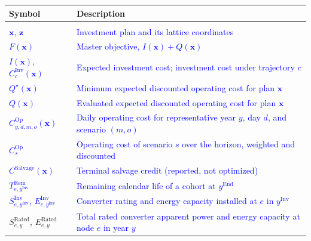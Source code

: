 \documentclass[preprint,12pt]{elsarticle}
\begin{document}
\begingroup
    \footnotesize
    \setlength{\LTpre}{0pt}
    \setlength{\LTpost}{0pt}
    \begin{longtable}{@{}>{\raggedright\arraybackslash}p{} >{\raggedright\arraybackslash}p{}@{}}
        \toprule
        \textbf{Symbol} & \textbf{Description} \\
        \midrule
        \endhead
        \midrule
        \endfoot
        \bottomrule
        \endlastfoot
        \multicolumn{2}{@{}l}{\textbf{Planning}}\\*
        \textcolor{blue}{$\boldsymbol{x}$, $\boldsymbol{z}$} & \textcolor{blue}{Investment plan and its lattice coordinates} \\
        \textcolor{blue}{$F(\boldsymbol{x})$} & \textcolor{blue}{Master objective, $I(\boldsymbol{x}) + Q(\boldsymbol{x})$} \\
        \textcolor{blue}{$I(\boldsymbol{x})$, $C^{\text{Inv}}_c(\boldsymbol{x})$} & \textcolor{blue}{Expected investment cost; investment cost under trajectory $c$} \\
        \textcolor{blue}{$Q^\star(\boldsymbol{x})$} & \textcolor{blue}{Minimum expected discounted operating cost for plan $\boldsymbol{x}$} \\
        \textcolor{blue}{$Q(\boldsymbol{x})$} & \textcolor{blue}{Evaluated expected discounted operating cost for plan $\boldsymbol{x}$} \\
        \textcolor{blue}{$C^{\text{Op}}_{y,d,m,o}(\boldsymbol{x})$} & \textcolor{blue}{Daily operating cost for representative year $y$, day $d$, and scenario $(m,o)$} \\
        \textcolor{blue}{$C^{\text{Op}}_{s}$} & \textcolor{blue}{Operating cost of scenario $s$ over the horizon, weighted and discounted}\\
        \textcolor{blue}{$C^{\text{Salvage}}(\boldsymbol{x})$} & \textcolor{blue}{Terminal salvage credit (reported, not optimized)} \\
        \textcolor{blue}{$T^{\text{Rem}}_{e,y^{\text{Inv}}}$} & \textcolor{blue}{Remaining calendar life of a cohort at $y^{\text{End}}$} \\
        \textcolor{blue}{$S^{\text{Inv}}_{e,y^{\text{Inv}}}$, $E^{\text{Inv}}_{e,y^{\text{Inv}}}$} & \textcolor{blue}{Converter rating and energy capacity installed at $e$ in $y^{\text{Inv}}$} \\
        $S^{\text{Rated}}_{e,y}$, $E^{\text{Rated}}_{e,y}$ & \textcolor{blue}{Total rated converter apparent power and energy capacity at node $e$ in year $y$} \\

\end{longtable}
\end{document}
